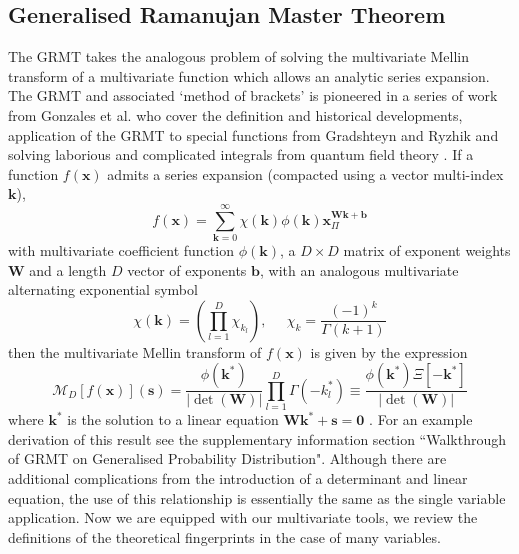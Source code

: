 \documentclass{article}
\begin{document}
\subsection{Generalised Ramanujan Master Theorem}
The GRMT takes the analogous problem of solving the multivariate Mellin transform of a multivariate function which allows an analytic series expansion. The GRMT and associated `method of brackets' \cite{Gonzalez2010} is pioneered in a series of work from Gonzales et al. \cite{Gonzalez2015} who cover the definition and historical developments, application of the GRMT to special functions from Gradshteyn and Ryzhik \cite{Kolbig1995, Gonzalez2015a, Gonzalez2015b} and solving laborious and complicated integrals from quantum field theory \cite{Gonzalez2010}. If a function $f(\mathbf{x})$ admits a series expansion (compacted using a vector multi-index $\mathbf{k}$),  \begin{equation}
f(\mathbf{x}) = \sum_{\mathbf{k}=0}^\infty \chi(\mathbf{k}) \phi(\mathbf{k}) \mathbf{x}^{\mathbf{W}\mathbf{k}+ \mathbf{b}}_\Pi
\end{equation}
with multivariate coefficient function $\phi(\mathbf{k})$, a $D\times D$ matrix of exponent weights $\mathbf{W}$ and a length $D$ vector of exponents $\mathbf{b}$, with an analogous multivariate alternating exponential symbol
\begin{equation}
\chi(\mathbf{k}) = \left(\prod_{l=1}^D \chi_{k_l}\right),\;\;\;\;\; \chi_k = \frac{(-1)^k}{\Gamma(k+1)}
\end{equation}
then the multivariate Mellin transform of $f(\mathbf{x})$ is given by the expression \begin{equation}
\mathcal{M}_D[f(\mathbf{x})](\mathbf{s}) = \frac{\phi(\mathbf{k}^*)}{|\det(\mathbf{W})|} \prod_{l=1}^D \Gamma(-k_l^*) \equiv \frac{\phi(\mathbf{k}^*)\Xi[-\mathbf{k}^*]}{|\det(\mathbf{W})|}
\label{eqn:GRMT}
\end{equation}
where $\mathbf{k}^*$ is the solution to a linear equation $\mathbf{W}\mathbf{k^*}+\mathbf{s}=\mathbf{0}$ \cite{Gonzalez2015}. For an example derivation of this result see the supplementary information section ``Walkthrough of GRMT on Generalised Probability Distribution". Although there are additional complications from the introduction of a determinant and linear equation, the use of this relationship is essentially the same as the single variable application. Now we are equipped with our multivariate tools, we review the definitions of the theoretical fingerprints in the case of many variables.
\end{document}
